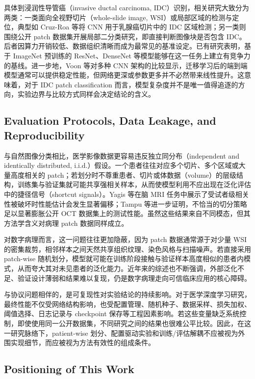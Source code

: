 具体到浸润性导管癌（invasive ductal carcinoma, IDC）识别，相关研究大致分为两类：一类面向全视野切片（whole-slide image, WSI）或局部区域的检测与定位，典型如 Cruz-Roa 等将 CNN 用于乳腺癌切片中的 IDC 区域检测\cite{CruzRoa2014}；另一类则围绕公开 patch 数据集开展局部二分类研究，即直接判断图像块是否包含 IDC。后者因算力开销较低、数据组织清晰而成为最常见的基准设定。已有研究表明，基于 ImageNet 预训练的 ResNet、DenseNet 等模型能够在这一任务上建立有竞争力的基线\cite{Celik2020,Abdolahi2020}。进一步地，Voon 等对多种 CNN 架构的比较显示，迁移学习后的端到端模型通常可以提供稳定性能，但网络更深或参数更多并不必然带来线性提升\cite{Voon2022}。这意味着，对于 IDC patch classification 而言，模型复杂度并不是唯一值得追逐的方向，实验边界与比较方式同样会决定结论的含义。

\subsection{Evaluation Protocols, Data Leakage, and Reproducibility}

与自然图像分类相比，医学影像数据更容易违反独立同分布（independent and identically distributed, i.i.d.）假设。一个患者往往对应多个切片、多个区域或大量高度相关的 patch；若划分时不尊重患者、切片或体数据（volume）的层级结构，训练集与验证集就可能共享强相关样本，从而使模型利用不应出现在泛化评估中的捷径信号（shortcut signals）。Yagis 等在脑 MRI 任务中展示了受试者级相关性被破坏时性能估计会发生显著偏移\cite{Yagis2021}；Tampu 等进一步证明，不恰当的切分策略足以显著膨胀公开 OCT 数据集上的测试性能\cite{Tampu2022}。虽然这些结果来自不同模态，但其方法学含义对病理 patch 数据同样成立。

对数字病理而言，这一问题往往更加隐蔽，因为 patch 数据通常源于对少量 WSI 的密集裁剪，相邻样本之间天然共享组织纹理、染色风格与扫描噪声。若直接采用 patch-wise 随机划分，模型就可能在训练阶段接触与验证样本高度相似的患者内模式，从而夸大其对未见患者的泛化能力。近年来的综述也不断强调，外部泛化不足、验证设计薄弱和结果难以复现，仍是数字病理走向可信临床应用的核心障碍\cite{vanDerLaak2021,McGenity2024,Rad2025}。

与协议问题相伴的，是可复现性对实验结论的持续影响。对于医学深度学习研究，最终性能不仅受网络结构影响，也受配置管理、随机种子、数据采样、损失加权、阈值选择、日志记录与 checkpoint 保存等工程因素影响。若这些变量缺乏系统控制，即使使用同一公开数据集，不同研究之间的结果也很难公平比较\cite{McGenity2024,Huang2025}。因此，在这一研究脉络下，patient-wise 划分、配置驱动实验和训练/评估解耦不应被视为外围实现细节，而应被视为方法有效性的组成条件。

\subsection{Positioning of This Work}

